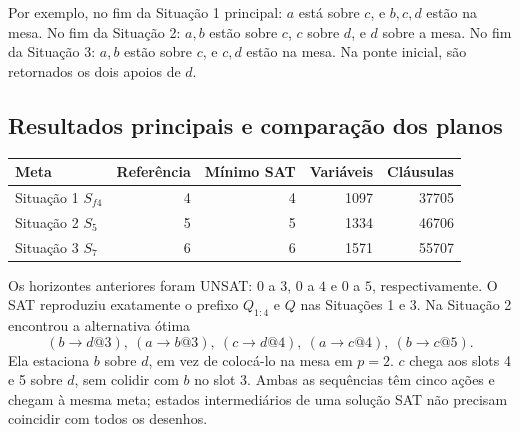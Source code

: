\documentclass[11pt,a4paper]{article}
\begin{document}
Por exemplo, no fim da Situação 1 principal: $a$ está sobre $c$, e $b,c,d$ estão na mesa. No fim da Situação 2: $a,b$ estão sobre $c$, $c$ sobre $d$, e $d$ sobre a mesa. No fim da Situação 3: $a,b$ estão sobre $c$, e $c,d$ estão na mesa. Na ponte inicial, são retornados os dois apoios de $d$.

\subsection{Resultados principais e comparação dos planos}
\begin{center}\small
\begin{tabular}{@{}lrrrr@{}}\toprule
Meta & Referência & Mínimo SAT & Variáveis & Cláusulas\\\midrule
Situação 1 $S_{f4}$ & 4 & 4 & 1097 & 37705\\
Situação 2 $S_5$ & 5 & 5 & 1334 & 46706\\
Situação 3 $S_7$ & 6 & 6 & 1571 & 55707\\\bottomrule
\end{tabular}\end{center}
Os horizontes anteriores foram UNSAT: $0$ a $3$, $0$ a $4$ e $0$ a $5$, respectivamente. O SAT reproduziu exatamente o prefixo $Q_{1:4}$ e $Q$ nas Situações 1 e 3. Na Situação 2 encontrou a alternativa ótima
\[
(b\to d@3),\ (a\to b@3),\ (c\to d@4),\ (a\to c@4),\ (b\to c@5).
\]
Ela estaciona $b$ sobre $d$, em vez de colocá-lo na mesa em $p=2$. $c$ chega aos slots 4 e 5 sobre $d$, sem colidir com $b$ no slot 3. Ambas as sequências têm cinco ações e chegam à mesma meta; estados intermediários de uma solução SAT não precisam coincidir com todos os desenhos.
\end{document}
